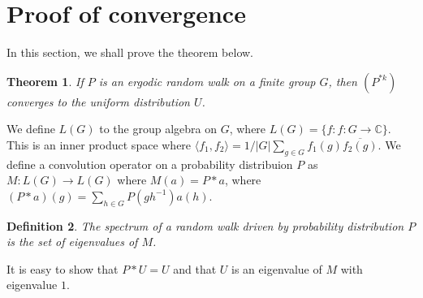 \documentclass[]{article}
\newtheorem{theorem}{Theorem}
\newtheorem{definition}[theorem]{Definition}
\theoremstyle{definition}
\numberwithin{theorem}{section}
\numberwithin{equation}{section}
\begin{document}
\section{Proof of convergence}
In this section, we shall prove the theorem below.
\begin{theorem}
	If $P$ is an ergodic random walk on a finite group $G$, then $(P^{\ast k})$ converges to the uniform distribution $U$. 
\end{theorem}
We define $L(G)$ to the group algebra on $G$, where $L(G) = \lbrace f : f: G \rightarrow \mathbb{C} \rbrace$. This is an inner product space where $\langle f_1, f_2 \rangle = 1/|G| \sum_{g \in G} f_1(g) \overline{f_2(g)}$. 
We define a convolution operator on a probability distribuion $P$ as $M : L(G) \rightarrow L(G)$ where $M(a) = P \ast a$, where $(P \ast a) (g) =\sum_{h\in G} P(gh^{-1})a(h)$.
\begin{definition}
	The spectrum of a random walk driven by probability distribution $P$ is the set of eigenvalues of $M$. 
\end{definition} 
It is easy to show that $P \ast U = U$ and that $U$ is an eigenvalue of $M$ with eigenvalue $1$. 
\end{document}
